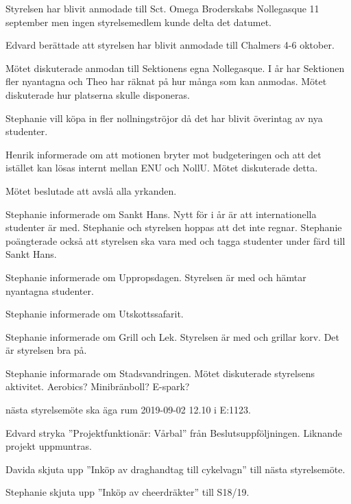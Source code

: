 \documentclass[10pt]{article}
\begin{document}
\begin{paragrafer}

Styrelsen har blivit anmodade till Sct. Omega Broderskabs Nollegasque 11 september men ingen styrelsemedlem kunde delta det datumet. 

Edvard berättade att styrelsen har blivit anmodade till Chalmers 4-6 oktober. 

Mötet diskuterade anmodan till Sektionens egna Nollegasque. I år har Sektionen fler nyantagna och Theo har räknat på hur många som kan anmodas. Mötet diskuterade hur platserna skulle disponeras.


Stephanie vill köpa in fler nollningströjor då det har blivit överintag av nya studenter. 

Henrik informerade om att motionen bryter mot budgeteringen och att det istället kan lösas internt mellan ENU och NollU. Mötet diskuterade detta. 

Mötet beslutade att avslå alla yrkanden. 

Stephanie informerade om Sankt Hans. Nytt för i år är att internationella studenter är med.
Stephanie och styrelsen hoppas att det inte regnar. Stephanie poängterade också att styrelsen ska vara med och tagga studenter under färd till Sankt Hans. 

Stephanie informerade om Uppropsdagen. Styrelsen är med och hämtar nyantagna studenter. 

Stephanie informerade om Utskottssafarit. 

Stephanie informerade om Grill och Lek. Styrelsen är med och grillar korv. Det är styrelsen bra på.  

Stephanie informarade om Stadsvandringen. Mötet diskuterade styrelsens aktivitet. Aerobics? Minibränboll? E-spark? 


\Mba nästa styrelsemöte ska äga rum 2019-09-02 12.10 i E:1123.


Edvard \ypa stryka ''Projektfunktionär: Vårbal'' från Beslutsuppföljningen. Liknande projekt uppmuntras.

\Mbaby

Davida \ypa skjuta upp ''Inköp av draghandtag till cykelvagn'' till nästa styrelsemöte.

\Mbaby

Stephanie \ypa skjuta upp ''Inköp av cheerdräkter'' till S18/19. 


\end{paragrafer}
\end{document}

